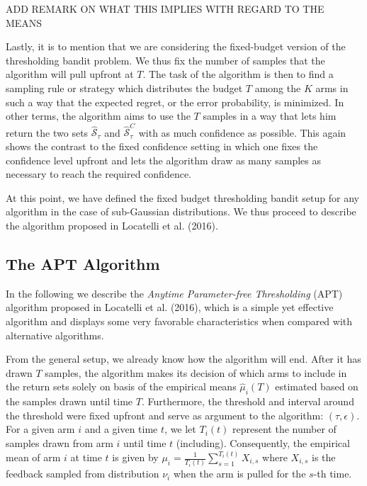 \documentclass[12pt,]{article}
\begin{document}
ADD REMARK ON WHAT THIS IMPLIES WITH REGARD TO THE MEANS

Lastly, it is to mention that we are considering the fixed-budget
version of the thresholding bandit problem. We thus fix the number of
samples that the algorithm will pull upfront at \(T\). The task of the
algorithm is then to find a sampling rule or strategy which distributes
the budget \(T\) among the \(K\) arms in such a way that the expected
regret, or the error probability, is minimized. In other terms, the
algorithm aims to use the \(T\) samples in a way that lets him return
the two sets \(\hat{\mathcal{S}}_{\tau}\) and
\(\hat{\mathcal{S}}_{\tau}^C\) with as much confidence as possible. This
again shows the contrast to the fixed confidence setting in which one
fixes the confidence level upfront and lets the algorithm draw as many
samples as necessary to reach the required confidence.

At this point, we have defined the fixed budget thresholding bandit
setup for any algorithm in the case of sub-Gaussian distributions. We
thus proceed to describe the algorithm proposed in Locatelli et al.
(2016).

\subsection{The APT Algorithm}\label{the-apt-algorithm}

In the following we describe the \emph{Anytime Parameter-free
Thresholding} (APT) algorithm proposed in Locatelli et al. (2016), which
is a simple yet effective algorithm and displays some very favorable
characteristics when compared with alternative algorithms.

From the general setup, we already know how the algorithm will end.
After it has drawn \(T\) samples, the algorithm makes its decision of
which arms to include in the return sets solely on basis of the
empirical means \(\hat{\mu}_i(T)\) estimated based on the samples drawn
until time \(T\). Furthermore, the threshold and interval around the
threshold were fixed upfront and serve as argument to the algorithm:
\((\tau, \epsilon)\). For a given arm \(i\) and a given time \(t\), we
let \(T_i(t)\) represent the number of samples drawn from arm \(i\)
until time \(t\) (including). Consequently, the empirical mean of arm
\(i\) at time \(t\) is given by
\(\mu_i = \frac{1}{T_i(t)} \sum_{s=1}^{T_i(t)} X_{i,s}\) where
\(X_{i,s}\) is the feedback sampled from distribution \(\nu_i\) when the
arm is pulled for the \(s\)-th time.
\end{document}

